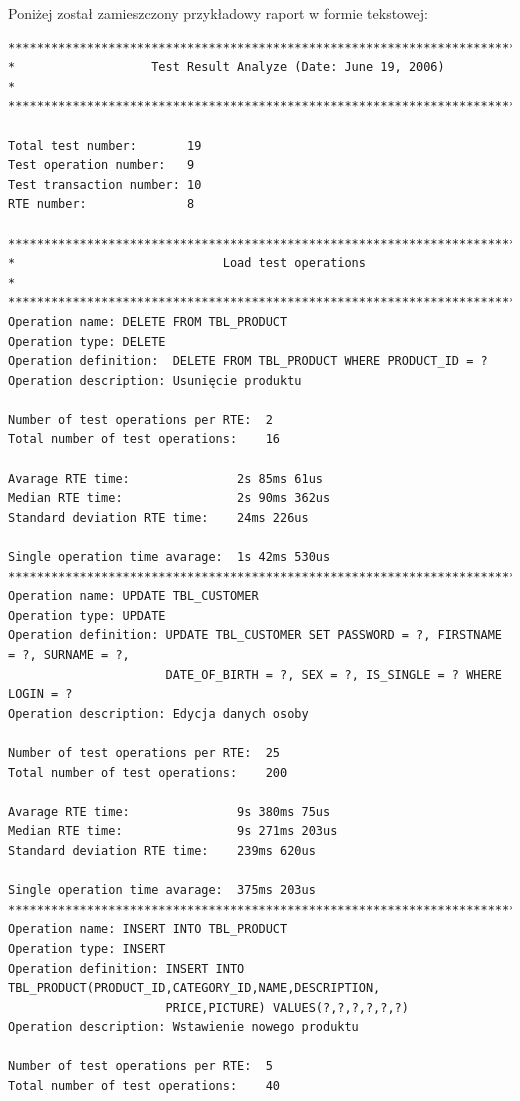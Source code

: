 Poniżej został zamieszczony przykładowy raport w formie tekstowej:\\
\begin{Verbatim}
*********************************************************************************
*                   Test Result Analyze (Date: June 19, 2006)                   *
*********************************************************************************

Total test number:       19
Test operation number:   9
Test transaction number: 10
RTE number:              8

*********************************************************************************
*                             Load test operations                              *
*********************************************************************************
Operation name: DELETE FROM TBL_PRODUCT
Operation type: DELETE
Operation definition:  DELETE FROM TBL_PRODUCT WHERE PRODUCT_ID = ?
Operation description: Usunięcie produktu

Number of test operations per RTE:  2
Total number of test operations:    16

Avarage RTE time:               2s 85ms 61us
Median RTE time:                2s 90ms 362us
Standard deviation RTE time:    24ms 226us

Single operation time avarage:  1s 42ms 530us
*********************************************************************************
Operation name: UPDATE TBL_CUSTOMER
Operation type: UPDATE
Operation definition: UPDATE TBL_CUSTOMER SET PASSWORD = ?, FIRSTNAME = ?, SURNAME = ?, 
                      DATE_OF_BIRTH = ?, SEX = ?, IS_SINGLE = ? WHERE LOGIN = ?
Operation description: Edycja danych osoby

Number of test operations per RTE:  25
Total number of test operations:    200

Avarage RTE time:               9s 380ms 75us
Median RTE time:                9s 271ms 203us
Standard deviation RTE time:    239ms 620us

Single operation time avarage:  375ms 203us
*********************************************************************************
Operation name: INSERT INTO TBL_PRODUCT
Operation type: INSERT
Operation definition: INSERT INTO TBL_PRODUCT(PRODUCT_ID,CATEGORY_ID,NAME,DESCRIPTION,
                      PRICE,PICTURE) VALUES(?,?,?,?,?,?)
Operation description: Wstawienie nowego produktu

Number of test operations per RTE:  5
Total number of test operations:    40


\end{Verbatim}
